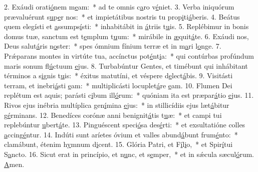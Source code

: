 2. Exáudi orati\uline{ó}nem m\uline{e}am:~* ad te omnis c\uline{a}ro v\uline{é}niet.
3. Verba iniquórum prævaluérunt s\uline{u}p\uline{e}r nos:~* et impietátibus nostris tu prop\uline{i}ti\uline{á}beris.
4. Beátus quem elegísti et \uline{a}ssumps\uline{í}sti:~* inhabitábit in \uline{á}triis t\uline{u}is.
5. Replébimur in bonis domus tuæ, sanctum est t\uline{e}mplum t\uline{u}um:~* mirábile in \uline{æ}quit\uline{á}te.
6. Exáudi nos, Deus salut\uline{á}ris n\uline{o}ster:~* spes ómnium fínium terræ et in m\uline{a}ri l\uline{o}nge.
7. Prǽparans montes in virtúte tua, accínctus pot\uline{é}nt\uline{i}a:~* qui contúrbas profúndum maris sonum fl\uline{ú}ctuum \uline{e}jus.
8. Turbabúntur Gentes, et timébunt qui inhábitant términos a s\uline{i}gnis t\uline{u}is:~* éxitus matutíni, et véspere d\uline{e}lect\uline{á}bis.
9. Visitásti terram, et inebri\uline{á}sti \uline{e}am:~* multiplicásti locuplet\uline{á}re \uline{e}am.
10. Flumen Dei replétum est aquis; parásti c\uline{i}bum ill\uline{ó}rum:~* quóniam ita est præpar\uline{á}tio \uline{e}jus.
11. Rivos ejus inébria multíplica gen\uline{í}mina \uline{e}jus:~* in stillicídiis ejus læt\uline{á}bitur g\uline{é}rminans.
12. Benedíces corónæ anni benignit\uline{á}tis t\uline{u}æ:~* et campi tui replebúntur \uline{u}bert\uline{á}te.
13. Pinguéscent speci\uline{ó}sa des\uline{é}rti:~* et exsultatióne colles \uline{a}ccing\uline{é}ntur.
14. Indúti sunt aríetes óvium et valles abund\uline{á}bunt frum\uline{é}nto:~* clamábunt, étenim h\uline{y}mnum d\uline{i}cent.
15. Glória Patri, et F\uline{í}l\uline{i}o,~* et Spir\uline{í}tui S\uline{a}ncto.
16. Sicut erat in princípio, et n\uline{u}nc, et s\uline{e}mper,~* et in sǽcula sæcul\uline{ó}rum. \uline{A}men.
